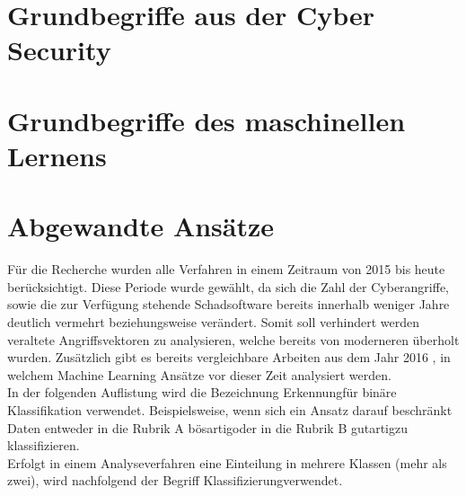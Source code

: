 \documentclass[
    12pt, %
    DIV10,
    ngerman, %
    a4paper, %
    oneside, %
    titlepage, %
    parskip=half, %
    headings=normal, %
    listof=totoc, %
    bibliography=totoc, %
    index=totoc, %
    captions=tableheading, %
    final %
]{scrreprt}
\begin{document}
\section{Grundbegriffe aus der Cyber Security}
\section{Grundbegriffe des maschinellen Lernens}
\section{Abgewandte Ansätze}
Für die Recherche wurden alle Verfahren in einem Zeitraum von 2015 bis heute berücksichtigt. Diese Periode wurde gewählt, da sich die Zahl der Cyberangriffe, sowie die zur Verfügung stehende Schadsoftware bereits innerhalb weniger Jahre deutlich vermehrt beziehungsweise verändert. Somit soll verhindert werden veraltete Angriffsvektoren zu analysieren, welche bereits von moderneren überholt wurden. Zusätzlich gibt es bereits vergleichbare Arbeiten aus dem Jahr 2016 \parencite[s.][]{Buczak2016}, in welchem Machine Learning Ansätze vor dieser Zeit analysiert werden.\\
In der folgenden Auflistung wird die Bezeichnung \glqq Erkennung\grqq für binäre Klassifikation verwendet. Beispielsweise, wenn sich ein Ansatz darauf beschränkt Daten entweder in die Rubrik A \glqq bösartig\grqq oder in die Rubrik B \glqq gutartig\grqq zu klassifizieren.\\
Erfolgt in einem Analyseverfahren eine Einteilung in mehrere Klassen (mehr als zwei), wird nachfolgend der Begriff 
\glqq Klassifizierung\grqq verwendet.
\\\\
\end{document}
